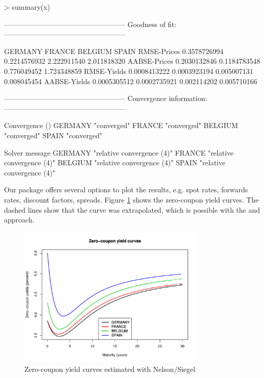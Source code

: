 \begin{Schunk}
\begin{Sinput}
> summary(x)
\end{Sinput}
\begin{Soutput}
---------------------------------------------------
Goodness of fit:
---------------------------------------------------

                  GERMANY       FRANCE     BELGIUM       SPAIN
RMSE-Prices  0.3578726994 0.2214576932 2.222911540 2.011818320
AABSE-Prices 0.2030132846 0.1184783548 0.776049452 1.724348859
RMSE-Yields  0.0008413222 0.0003923194 0.005007131 0.008045454
AABSE-Yields 0.0005305512 0.0002735921 0.002114202 0.005710166


---------------------------------------------------
Convergence information:
---------------------------------------------------

        Convergence ()
GERMANY "converged"   
FRANCE  "converged"   
BELGIUM "converged"   
SPAIN   "converged"   

        Solver message            
GERMANY "relative convergence (4)"
FRANCE  "relative convergence (4)"
BELGIUM "relative convergence (4)"
SPAIN   "relative convergence (4)"
\end{Soutput}
\end{Schunk}



Our package offers several options to plot the results, e.g. spot rates, forwards rates, discount factors, spreads. Figure \ref{fig:spotcurves} shows the zero-coupon yield curves. The dashed lines show that the curve was extrapolated, which is possible with the \cite{Nelson1987} and \cite{Svensson1994} approach.

\begin{figure}[htb]
\centering
\caption{Zero-coupon yield curves estimated with Nelson/Siegel}
\label{fig:spotcurves}
\includegraphics[width=0.8\textwidth]{fig_eurospotcurves}
\end{figure}


